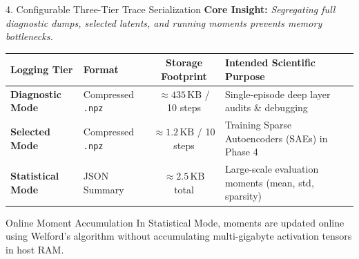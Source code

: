 \documentclass[aspectratio=169, 10pt]{beamer}
\begin{document}
\begin{frame}{4. Configurable Three-Tier Trace Serialization}
  \textbf{Core Insight:} \textit{Segregating full diagnostic dumps, selected latents, and running moments prevents memory bottlenecks.}

  \vspace{0.3cm}
  \begin{table}[h]
    \centering
    \small
    \begin{tabular}{llcl}
      \toprule
      \textbf{Logging Tier} & \textbf{Format} & \textbf{Storage Footprint} & \textbf{Intended Scientific Purpose} \\
      \midrule
      \textbf{Diagnostic Mode} & Compressed \texttt{.npz} & $\approx 435\,\text{KB}$ / 10 steps & Single-episode deep layer audits \& debugging \\
      \textbf{Selected Mode} & Compressed \texttt{.npz} & $\approx 1.2\,\text{KB}$ / 10 steps & Training Sparse Autoencoders (SAEs) in Phase 4 \\
      \textbf{Statistical Mode} & JSON Summary & $\approx 2.5\,\text{KB}$ total & Large-scale evaluation moments (mean, std, sparsity) \\
      \bottomrule
    \end{tabular}
  \end{table}

  \vspace{0.3cm}
  \begin{block}{Online Moment Accumulation}
    \small
    In Statistical Mode, moments are updated online using Welford's algorithm without accumulating multi-gigabyte activation tensors in host RAM.
  \end{block}
\end{frame}
\end{document}
